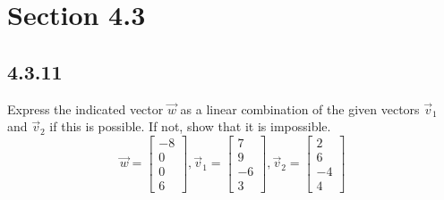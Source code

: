 \documentclass{article}
\begin{document}
\newcommand{\hr}{\par\noindent\rule{\textwidth}{0.4pt}}

\newcommand{\bc}[1]{
	\begin{equation*}
		\begin{boxed}
			{#1}
		\end{boxed}
	\end{equation*}
}

\newcommand{\cond}[2]{
	\ifmmode
		{#1} \quad {#2}
	\else
		$$ {#1} \quad {#2} $$
	\fi
}

\newcommand{\matr}[1]{\mathbf{#1}}

\tableofcontents

\section{Section 4.3}

\subsection{4.3.11}

Express the indicated vector $ \vec{w} $ as a linear combination of the given vectors $ \vec{v}_1 $ and $ \vec{v}_2 $ if this is possible. If not, show that it is impossible.
\begin{equation*}
	\vec{w} =
		\begin{bmatrix}
			-8 \\ 0 \\ 0 \\ 6
		\end{bmatrix},
	\vec{v}_1 =
		\begin{bmatrix}
			7 \\ 9 \\ -6 \\ 3
		\end{bmatrix},
	\vec{v}_2 =
		\begin{bmatrix}
			2 \\ 6 \\ -4 \\ 4
		\end{bmatrix}
\end{equation*}
\end{document}
